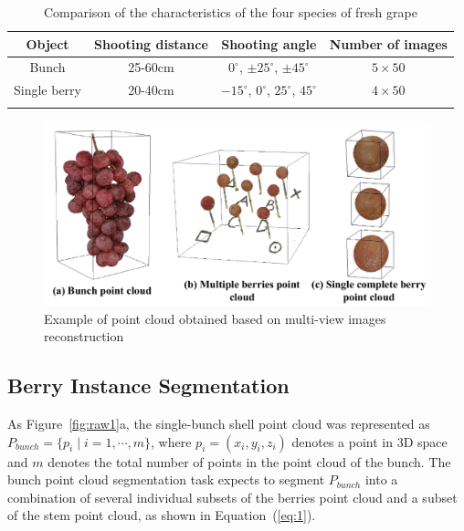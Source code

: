 \documentclass[12pt]{article}
\begin{document}
\begin{table}[h]
    \centering
    \caption{Comparison of the characteristics of the four species of fresh grape}
    \begin{tabular}{cccc}
        \hline
        \textbf{Object} & \textbf{Shooting distance} & \textbf{Shooting angle} & \textbf{Number of images} \\
        \hline
        Bunch        & 25-60cm & $0^{\circ}$, $\pm 25^{\circ}$, $\pm 45^{\circ}$ & $5 \times 50$ \\
        Single berry & 20-40cm & $-15^{\circ}$, $0^{\circ}$, $25^{\circ}$, $45^{\circ}$ & $4 \times 50$ \\
        \hline
    \label{tbl:2}
    \end{tabular}
\end{table}

\begin{figure}[hbt!]
    \centering
    \includegraphics[width=1\textwidth]{figures/Figure4.pdf}
    \caption{Example of point cloud obtained based on multi-view images reconstruction}
    \label{fig:raw10}
\end{figure}

\subsection{Berry Instance Segmentation}
\label{sec:22}

As Figure~\ref{fig:raw1}a, the single-bunch shell point cloud was represented as $P_{bunch}=\{p_i \mid i=1, \cdots, m\}$, where $p_i=(x_i,y_i,z_i)$ denotes a point in 3D space and $m$ denotes the total number of points in the point cloud of the bunch. The bunch point cloud segmentation task expects to segment $P_{bunch}$ into a combination of several individual subsets of the berries point cloud and a subset of the stem point cloud, as shown in Equation~(\ref{eq:1}).
\end{document}
